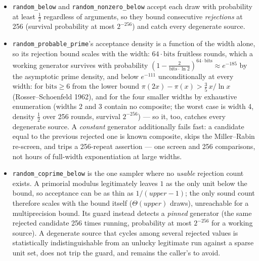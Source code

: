 \documentclass[11pt]{article}
\newcommand{\code}[1]{\texttt{#1}}
\begin{document}
\begin{itemize}
\item \code{random\_below} and \code{random\_nonzero\_below} accept each
  draw with probability at least $\tfrac12$ regardless of arguments, so
  they bound consecutive \emph{rejections} at 256 (survival probability
  at most $2^{-256}$) and catch every degenerate source.
\item \code{random\_probable\_prime}'s acceptance density is a function
  of the width alone, so its rejection bound scales with the width:
  $64 \cdot \mathrm{bits}$ fruitless rounds, which a working generator
  survives with probability
  $(1 - \tfrac{2}{\mathrm{bits} \cdot \ln 2})^{64 \cdot \mathrm{bits}}
  \approx e^{-185}$ by the asymptotic prime density, and below
  $e^{-111}$ unconditionally at every width: for $\mathrm{bits} \ge 6$
  from the lower bound $\pi(2x) - \pi(x) > \tfrac35\, x/\ln x$
  (Rosser--Schoenfeld 1962), and for the four smaller widths by
  exhaustive enumeration (widths 2 and 3 contain no composite; the worst
  case is width 4, density $\tfrac12$ over 256 rounds, survival
  $2^{-256}$) --- so it, too, catches every degenerate source. A \emph{constant} generator additionally
  fails fast: a candidate equal to the previous rejected one is known
  composite, skips the Miller--Rabin re-screen, and trips a 256-repeat
  assertion --- one screen and 256 comparisons, not hours of full-width
  exponentiation at large widths.
\item \code{random\_coprime\_below} is the one sampler where no
  \emph{usable} rejection count exists. A primorial modulus legitimately
  leaves $1$ as the only unit below the bound, so acceptance can be as
  thin as $1/(\mathit{upper}-1)$; the only sound count therefore scales
  with the bound itself ($\Theta(\mathit{upper})$ draws), unreachable for
  a multiprecision bound. Its guard instead detects a \emph{pinned}
  generator (the same rejected candidate 256 times running, probability
  at most $2^{-256}$ for a working source). A degenerate source that
  cycles among several rejected values is statistically
  indistinguishable from an unlucky legitimate run against a sparse unit
  set, does not trip the guard, and remains the caller's to avoid.
\end{itemize}
\end{document}

